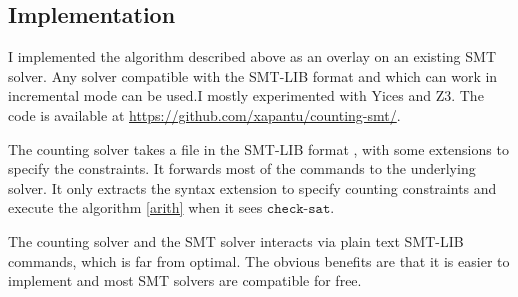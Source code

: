 \documentclass[]{article}
\begin{document}
%
%
%
%
%
%
%
%
%
%
%
%
%
\subsection{Implementation}

I implemented the algorithm described above as an overlay on an existing SMT solver. Any solver
compatible with the SMT-LIB format \cite{barrett2010smt} and which can work in incremental mode can
be used.I mostly experimented with Yices and Z3. The code is available at
\url{https://github.com/xapantu/counting-smt/}.

The counting solver takes a file in the SMT-LIB format \cite{barrett2010smt}, with some extensions
to specify the constraints. It forwards most of the commands to the underlying solver. It only
extracts the syntax extension to specify counting constraints and execute the algorithm \ref{arith}
when it sees $\texttt{check-sat}$.

The counting solver and the SMT solver interacts via plain text SMT-LIB  commands, which is far from
optimal. The obvious benefits are that it is easier to implement and most SMT solvers are compatible
for free.
\end{document}

